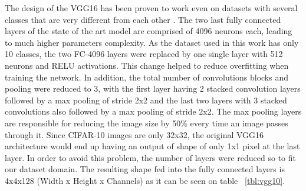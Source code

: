 The design of the VGG16 has been proven to work even on datasets with several classes that are very different from each other . The two last fully connected layers of the state of the art model are comprised of 4096 neurons each, leading to much higher parameters complexity. As the dataset used in this work has only 10 classes, the two FC-4096 layers were replaced by one single layer with 512 neurons and RELU activations. This change helped to reduce overfitting when training the network. In addition, the total number of convolutions blocks and pooling were reduced to 3, with the first layer having 2 stacked convolution layers followed by a max pooling of stride 2x2 and the last two layers with 3 stacked convolutions also followed by a max pooling of stride 2x2. The max pooling layers are responsible for reducing the image size by 50\% every time an image passes through it. Since CIFAR-10 images are only 32x32, the original VGG16 architecture would end up having an output of shape of only 1x1 pixel at the last layer. In order to avoid this problem, the number of layers were reduced so to fit our dataset domain. The resulting shape fed into the fully connected layers is 4x4x128 (Width x Height x Channels) as it can be seen on table ~\ref{tbl:vgg10}. 

